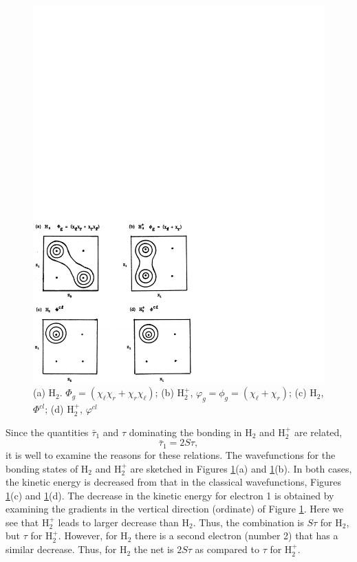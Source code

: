 \begin{figure}
\includegraphics[scale=0.75]{fig2-33}
\caption{(a) H$_2$. $\Phi_g = (\chi_\ell \chi_r + \chi_r \chi_\ell)$;
(b) H$^+_2$, $\varphi_g = \phi_g = ( \chi_\ell + \chi_r)$;
(c) H$_2$, $\Phi^{cl}$; (d) H$^+_2$, $\varphi^{cl}$}
\label{fig2-33}
\end{figure}

Since the quantities ${\bar{\tau}}_1$ and $\tau$ dominating the
bonding in H$_2$ and H$_2^+$ are related, 
\begin{equation}
{\bar{\tau}}_1 = 2S\tau,
\end{equation}
it is well to examine the reasons for these relations. The
wavefunctions for the bonding states of H$_2$ and H$^+_2$ are sketched
in Figures \ref{fig2-33}(a) and \ref{fig2-33}(b). In both cases, the
kinetic energy is decreased from that in the classical wavefunctions,
Figures \ref{fig2-33}(c) and \ref{fig2-33}(d).  The decrease in the
kinetic energy for electron 1 is obtained by examining the gradients
in the vertical direction (ordinate) of Figure \ref{fig2-33}. Here we
see that H$^+_2$ leads to larger decrease than H$_2$. Thus, the
combination is $S \tau$ for H$_2$, but $\tau$ for H$^+_2$.  However,
for H$_2$ there is a second electron (number 2) that has a similar
decrease. Thus, for H$_2$ the net is $2S \tau$ as compared to $\tau$
for H$^+_2$.

